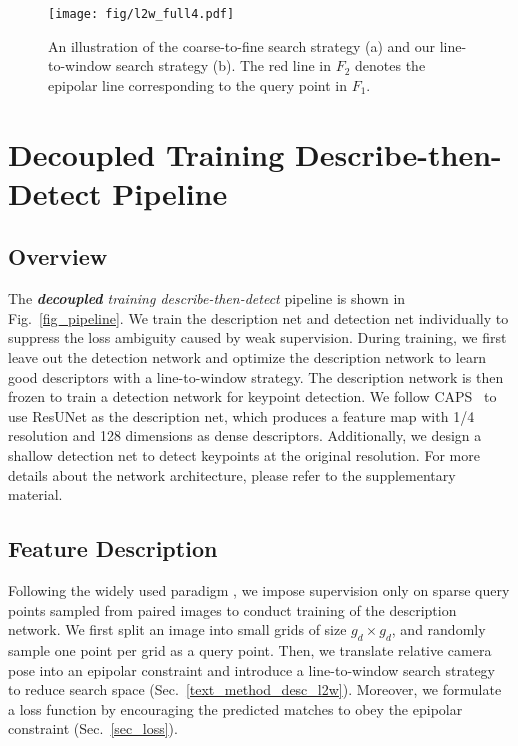 \documentclass[10pt,twocolumn,letterpaper]{article}
\begin{document}
\begin{figure*}[t]
    \centering
    \texttt{[image: fig/l2w\_full4.pdf]}
    \caption{An illustration of the coarse-to-fine search strategy (a) and our line-to-window search strategy (b). The red line in $F_2$ denotes the epipolar line corresponding to the query point in $F_1$.}
    \label{fig_l2w}
\end{figure*}

\section{Decoupled Training Describe-then-Detect Pipeline}

\subsection{Overview}
\label{text_overview}
The \textit{\textbf{decoupled} training describe-then-detect} pipeline is shown in Fig.~\ref{fig_pipeline}. We train the description net and detection net individually to suppress the loss ambiguity caused by weak supervision.  During training, we first leave out the detection network and optimize the description network to learn good descriptors with a line-to-window strategy. The description network is then frozen to train a detection network for keypoint detection. We follow CAPS~\cite{wangLearningFeatureDescriptors2020} to use ResUNet as the description net, which produces a feature map with 1/4 resolution and 128 dimensions as dense descriptors. Additionally, we design a shallow detection net to detect keypoints at the original resolution. For more details about the network architecture, please refer to the supplementary material.


\subsection{Feature Description}
\label{text_method_desc}
Following the widely used paradigm \cite{wangLearningFeatureDescriptors2020}, we impose supervision only on sparse query points sampled from paired images to conduct training of the description network. We first split an image into small grids of size $g_d\times g_d$, and randomly sample one point per grid as a query point. Then, we translate
relative camera pose into an epipolar constraint and  introduce a line-to-window search strategy to reduce search space  (Sec.~\ref{text_method_desc_l2w}). 
Moreover, we formulate a loss function by encouraging the predicted matches to obey the epipolar constraint  (Sec.~\ref{sec_loss}).
\end{document}
